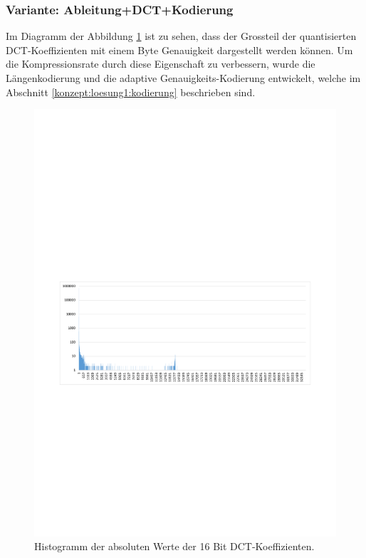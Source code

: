 \subsubsection{Variante: Ableitung+DCT+Kodierung} \label{resultate:loesung1:ableitung_dct_kodierung}
Im Diagramm der Abbildung \ref{resultate:loesung1:dct:histogramm} ist zu sehen, dass der Grossteil der quantisierten DCT-Koeffizienten mit einem Byte Genauigkeit dargestellt werden können. Um die Kompressionsrate durch diese Eigenschaft zu verbessern, wurde die Längenkodierung und die adaptive Genauigkeits-Kodierung entwickelt, welche im Abschnitt \ref{konzept:loesung1:kodierung} beschrieben sind.
\begin{figure}[!htbp]
	\center
	\includegraphics[trim = 1.8cm 11.25cm 1.8cm 12.75cm, clip=true,width=1\textwidth,keepaspectratio]{./pictures/resultate/loesung1/loesung1-6/histo.pdf}
	\caption{Histogramm der absoluten Werte der 16 Bit DCT-Koeffizienten.}
	\label{resultate:loesung1:dct:histogramm}
\end{figure}


